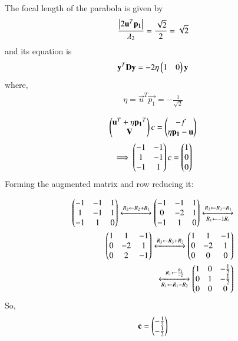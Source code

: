 \documentclass[journal,12pt,twocolumn]{IEEEtran}
\begin{document}
The focal length of the parabola is
given by
\begin{align}
\frac{\begin{vmatrix}2{\mathbf{u}}^T\mathbf{p_1}\end{vmatrix}}{\lambda_2 } = \frac{\sqrt{2}}{2} = \sqrt{2}
\end{align}
and its equation is
\begin{align}
\mathbf{y}^T\mathbf{D}\mathbf{y} = -2 \eta\begin{pmatrix}1 & 0 \end{pmatrix}\mathbf{y}
\end{align}
where,
\begin{align}
\eta = \vec{u}^T\vec{p_1} = - \frac{1}{\sqrt{2}}
\end{align}

\begin{align}
\begin{pmatrix}\mathbf{u}^T + \eta\mathbf{p_1}^T \\ \mathbf{V}\end{pmatrix}c = \begin{pmatrix}-f \\ \eta\mathbf{p_1} - \mathbf{u}\end{pmatrix} 
\end{align}
\begin{align}
\implies \begin{pmatrix} -1 & -1   \\ 1 & -1 \\ -1 & 1 \end{pmatrix}c = \begin{pmatrix}1 \\ 0 \\ 0\end{pmatrix}
\end{align}
Forming the augmented matrix and row reducing
it:



\begin{align}
\myvec{-1  &  -1 &  1 \\   1 & -1 &  1 \\  -1 & 1 & 0}  \label{2.30}
\xleftrightarrow[]{R_2 \leftarrow R_2+R_1  }
%
\myvec{
-1 & -1 & 1 \\ 0 & -2 & 1 \\ -1 & 1 & 0  
} 
\xleftrightarrow[R_1 \leftarrow -1R_1] {R_3 \leftarrow  R_3 - R_1}  \nonumber  \\
%
\myvec{
1 & 1 & -1 \\ 0 & -2 & 1 \\ 0 & 2 & -1 
}
\xleftrightarrow[]{R_3 \leftarrow R_3 +R_2 } 
%	
\myvec{
1 & 1 & -1 \\ 0 & -2 & 1 \\ 0 & 0 & 0 
} \nonumber   \\
\xleftrightarrow[R_1 \leftarrow R_1 -R_2]{R_1 \leftarrow \frac{R_1}{-2}} 
\myvec{
1 & 0 & -\frac{1}{2} \\ 0 & 1 & - \frac{1}{2} \\ 0 & 0 & 0
}
\end{align}
So,
\begin{align}
\mathbf{c} = \begin{pmatrix} -\frac{1}{2} \\ -\frac{1}{2}  \end{pmatrix} \label{2.31}
\end{align}
\end{document}
